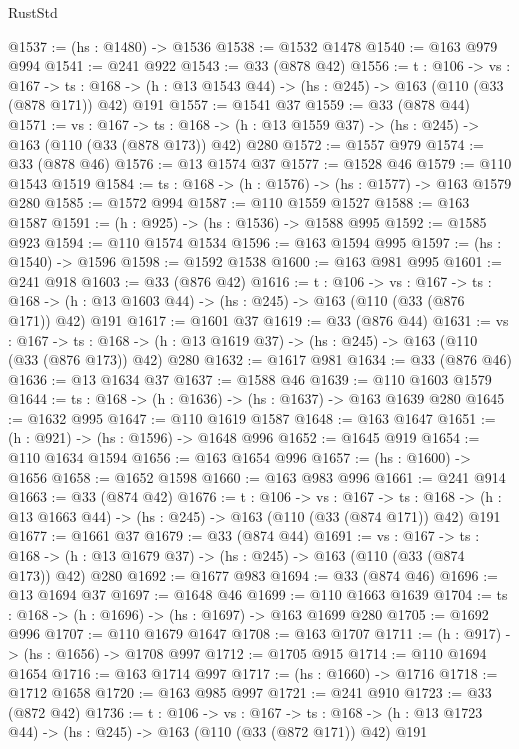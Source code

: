 \begin{lexlean}{RustStd}
\begin{coremodule}
@1537 := (hs : @1480) -> @1536
@1538 := @1532 @1478
@1540 := @163 @979 @994
@1541 := @241 @922
@1543 := @33 (@878 @42)
@1556 := {t : @106} ->
  {vs : @167} ->
  {ts : @168} -> (h : @13 @1543 @44) -> (hs : @245) -> @163 (@110 (@33 (@878 @171)) @42) @191
@1557 := @1541 @37
@1559 := @33 (@878 @44)
@1571 := {vs : @167} ->
  {ts : @168} -> (h : @13 @1559 @37) -> (hs : @245) -> @163 (@110 (@33 (@878 @173)) @42) @280
@1572 := @1557 @979
@1574 := @33 (@878 @46)
@1576 := @13 @1574 @37
@1577 := @1528 @46
@1579 := @110 @1543 @1519
@1584 := {ts : @168} -> (h : @1576) -> (hs : @1577) -> @163 @1579 @280
@1585 := @1572 @994
@1587 := @110 @1559 @1527
@1588 := @163 @1587
@1591 := (h : @925) -> (hs : @1536) -> @1588 @995
@1592 := @1585 @923
@1594 := @110 @1574 @1534
@1596 := @163 @1594 @995
@1597 := (hs : @1540) -> @1596
@1598 := @1592 @1538
@1600 := @163 @981 @995
@1601 := @241 @918
@1603 := @33 (@876 @42)
@1616 := {t : @106} ->
  {vs : @167} ->
  {ts : @168} -> (h : @13 @1603 @44) -> (hs : @245) -> @163 (@110 (@33 (@876 @171)) @42) @191
@1617 := @1601 @37
@1619 := @33 (@876 @44)
@1631 := {vs : @167} ->
  {ts : @168} -> (h : @13 @1619 @37) -> (hs : @245) -> @163 (@110 (@33 (@876 @173)) @42) @280
@1632 := @1617 @981
@1634 := @33 (@876 @46)
@1636 := @13 @1634 @37
@1637 := @1588 @46
@1639 := @110 @1603 @1579
@1644 := {ts : @168} -> (h : @1636) -> (hs : @1637) -> @163 @1639 @280
@1645 := @1632 @995
@1647 := @110 @1619 @1587
@1648 := @163 @1647
@1651 := (h : @921) -> (hs : @1596) -> @1648 @996
@1652 := @1645 @919
@1654 := @110 @1634 @1594
@1656 := @163 @1654 @996
@1657 := (hs : @1600) -> @1656
@1658 := @1652 @1598
@1660 := @163 @983 @996
@1661 := @241 @914
@1663 := @33 (@874 @42)
@1676 := {t : @106} ->
  {vs : @167} ->
  {ts : @168} -> (h : @13 @1663 @44) -> (hs : @245) -> @163 (@110 (@33 (@874 @171)) @42) @191
@1677 := @1661 @37
@1679 := @33 (@874 @44)
@1691 := {vs : @167} ->
  {ts : @168} -> (h : @13 @1679 @37) -> (hs : @245) -> @163 (@110 (@33 (@874 @173)) @42) @280
@1692 := @1677 @983
@1694 := @33 (@874 @46)
@1696 := @13 @1694 @37
@1697 := @1648 @46
@1699 := @110 @1663 @1639
@1704 := {ts : @168} -> (h : @1696) -> (hs : @1697) -> @163 @1699 @280
@1705 := @1692 @996
@1707 := @110 @1679 @1647
@1708 := @163 @1707
@1711 := (h : @917) -> (hs : @1656) -> @1708 @997
@1712 := @1705 @915
@1714 := @110 @1694 @1654
@1716 := @163 @1714 @997
@1717 := (hs : @1660) -> @1716
@1718 := @1712 @1658
@1720 := @163 @985 @997
@1721 := @241 @910
@1723 := @33 (@872 @42)
@1736 := {t : @106} ->
  {vs : @167} ->
  {ts : @168} -> (h : @13 @1723 @44) -> (hs : @245) -> @163 (@110 (@33 (@872 @171)) @42) @191

\end{coremodule}
\end{lexlean}
